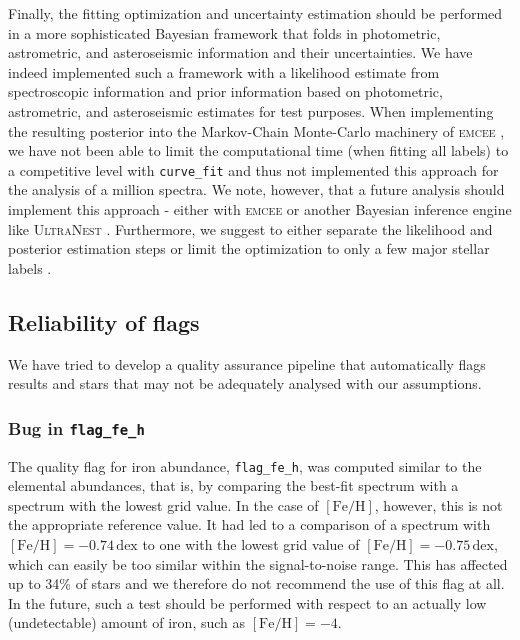\documentclass[
  journal=pasa,
  manuscript=research-paper, %
  year=2024,
  volume=37
]{cup-journal}
\newcommand{\feh}{$\mathrm{[Fe/H]}$\xspace}
\begin{document}
Finally, the fitting optimization and uncertainty estimation should be performed in a more sophisticated Bayesian framework that folds in photometric, astrometric, and asteroseismic information and their uncertainties. We have indeed implemented such a framework with a likelihood estimate from spectroscopic information and prior information based on photometric, astrometric, and asteroseismic estimates for test purposes. When implementing the resulting posterior into the Markov-Chain Monte-Carlo machinery of \textsc{emcee} \citep{ForemanMackey2013}, we have not been able to limit the computational time (when fitting all labels) to a competitive level with \texttt{curve\_fit} and thus not implemented this approach for the analysis of a million spectra. We note, however, that a future analysis should implement this approach - either with \textsc{emcee} or another Bayesian inference engine like \textsc{UltraNest} \citep{Buchner2021}. Furthermore, we suggest to either separate the likelihood and posterior estimation steps \citep[see e.g.][]{Gent2022} or limit the optimization to only a few major stellar labels \citep[see e.g.][]{Traven2020}.

\subsection{Reliability of flags} \label{sec:caveats_flags}

We have tried to develop a quality assurance pipeline that automatically flags results and stars that may not be adequately analysed with our assumptions.

\subsubsection{Bug in \texttt{flag\_fe\_h}}

The quality flag for iron abundance, \texttt{flag\_fe\_h}, was computed similar to the elemental abundances, that is, by comparing the best-fit spectrum with a spectrum with the lowest grid value. In the case of \feh, however, this is not the appropriate reference value. It had led to a comparison of a spectrum with $\mathrm{[Fe/H]} = -0.74\,\mathrm{dex}$ to one with the lowest grid value of $\mathrm{[Fe/H]} = -0.75\,\mathrm{dex}$, which can easily be too similar within the signal-to-noise range. This has affected up to 34\% of stars and we therefore do not recommend the use of this flag at all. In the future, such a test should be performed with respect to an actually low (undetectable) amount of iron, such as $\mathrm{[Fe/H]} = -4$.
\end{document}
